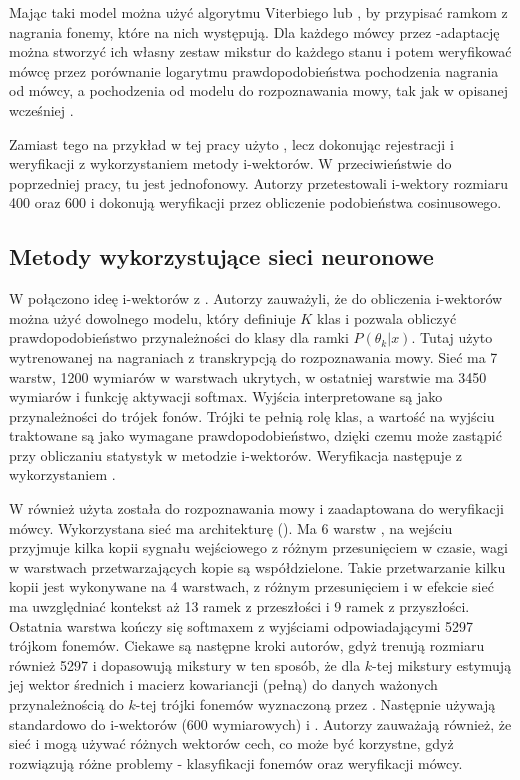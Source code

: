 Mając taki model można użyć algorytmu Viterbiego lub , by przypisać ramkom z nagrania
fonemy, które na nich występują. Dla każdego mówcy
przez -adaptację można stworzyć ich własny zestaw mikstur do każdego stanu i potem weryfikować
mówcę przez porównanie logarytmu prawdopodobieństwa
pochodzenia nagrania od mówcy, a pochodzenia od modelu do rozpoznawania mowy, tak jak
w opisanej wcześniej .

Zamiast tego na przykład w tej pracy \cite{iVectorHmmBased}
użyto , lecz dokonując rejestracji i weryfikacji z wykorzystaniem metody i-wektorów.
W przeciwieństwie do poprzedniej pracy, tu  jest jednofonowy. Autorzy przetestowali
i-wektory rozmiaru 400 oraz 600 i dokonują weryfikacji przez obliczenie podobieństwa cosinusowego.

\subsection{Metody wykorzystujące sieci neuronowe}

W \cite{aNovelSchemeFor}
połączono ideę i-wektorów z . Autorzy zauważyli, że do obliczenia i-wektorów można użyć
dowolnego modelu, który definiuje $K$ klas i pozwala obliczyć prawdopodobieństwo
przynależności do klasy dla ramki $P(\theta_k | x)$.
Tutaj użyto  wytrenowanej na nagraniach z transkrypcją do rozpoznawania mowy.
Sieć ma 7 warstw, 1200 wymiarów w warstwach ukrytych, w ostatniej warstwie ma 3450 wymiarów i funkcję aktywacji softmax.
Wyjścia interpretowane są jako przynależności do trójek fonów. Trójki te pełnią rolę klas,
a wartość na wyjściu traktowane są jako wymagane prawdopodobieństwo, dzięki czemu 
może zastąpić 
przy obliczaniu statystyk w metodzie i-wektorów. Weryfikacja następuje z wykorzystaniem .

W \cite{timeDelayDeep}
również użyta została  do rozpoznawania mowy i zaadaptowana do weryfikacji mówcy.
Wykorzystana sieć ma architekturę  (). Ma 6 warstw ,
na wejściu przyjmuje kilka kopii sygnału wejściowego z różnym przesunięciem w czasie, wagi
w warstwach przetwarzających kopie są współdzielone. Takie przetwarzanie kilku kopii jest wykonywane na
4 warstwach, z różnym przesunięciem i w efekcie sieć ma uwzględniać kontekst aż 13 ramek
z przeszłości i 9 ramek z przyszłości. Ostatnia warstwa kończy się softmaxem z wyjściami odpowiadającymi 5297 trójkom fonemów.
Ciekawe są następne kroki autorów, gdyż trenują  rozmiaru również 5297
i dopasowują mikstury w ten sposób, że dla $k$-tej mikstury estymują jej wektor średnich i macierz kowariancji (pełną)
do danych ważonych przynależnością do $k$-tej trójki fonemów wyznaczoną przez .
Następnie używają  standardowo do i-wektorów (600 wymiarowych) i .
Autorzy zauważają również, że sieć i  mogą używać różnych wektorów cech,
co może być korzystne, gdyż rozwiązują różne problemy - klasyfikacji fonemów oraz weryfikacji mówcy.

